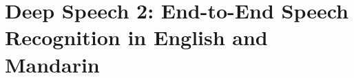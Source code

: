 \chapter[Deep Speech 2]{Deep Speech 2: End-to-End Speech Recognition in English and Mandarin}








